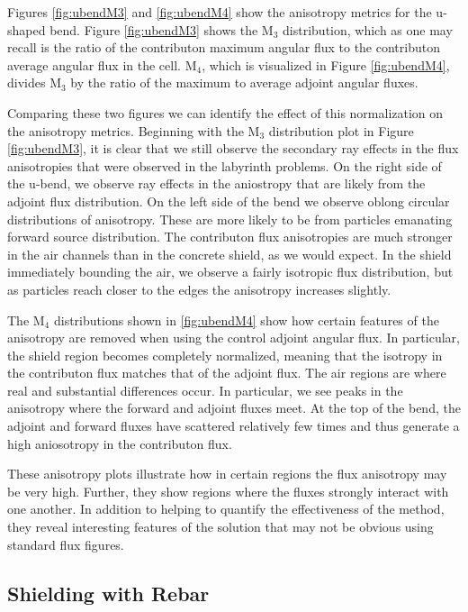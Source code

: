 Figures \ref{fig:ubendM3} and \ref{fig:ubendM4} show the anisotropy metrics for
the u-shaped bend. Figure \ref{fig:ubendM3} shows the M$_3$ distribution, which
as one may recall is the ratio of the contributon maximum angular flux to the
contributon average angular flux in the cell. M$_4$, which is visualized in
Figure \ref{fig:ubendM4}, divides M$_3$ by the ratio of the maximum to average
adjoint angular fluxes.

Comparing these two figures we can identify the effect
of this normalization on the anisotropy metrics. Beginning with the M$_3$
distribution plot in Figure \ref{fig:ubendM3}, it is clear that we still observe
the secondary ray effects in the flux anisotropies that were observed in the
labyrinth problems. On the right side of the u-bend, we observe ray effects in
the aniostropy that are likely from the adjoint flux distribution. On the left
side of the bend we observe oblong circular distributions of anisotropy. These
are more likely to be from particles emanating forward source distribution. The
contributon flux anisotropies are much stronger in the air channels than in the
concrete shield, as we would expect. In the shield immediately bounding the air,
we observe a fairly isotropic flux distribution, but as particles reach closer
to the edges the anisotropy increases slightly.

The M$_4$ distributions shown in \ref{fig:ubendM4} show how certain features of
the anisotropy are removed when using the control adjoint angular flux. In
particular, the shield region becomes completely normalized, meaning that the
isotropy in the contributon flux matches that of the adjoint flux. The air
regions are where real and substantial differences occur. In particular, we see
peaks in the anisotropy where the forward and adjoint fluxes meet. At the top of
the bend, the adjoint and forward fluxes have scattered relatively few times and
thus generate a high aniosotropy in the contributon flux.

These anisotropy plots illustrate how in certain regions the flux anisotropy may
be very high. Further, they show regions where the fluxes strongly interact with
one another. In addition to helping to quantify the effectiveness of the method,
they reveal interesting features of the solution that may not be obvious using
standard flux figures.

\subsection{Shielding with Rebar}
\label{subsec:resultrebar}


